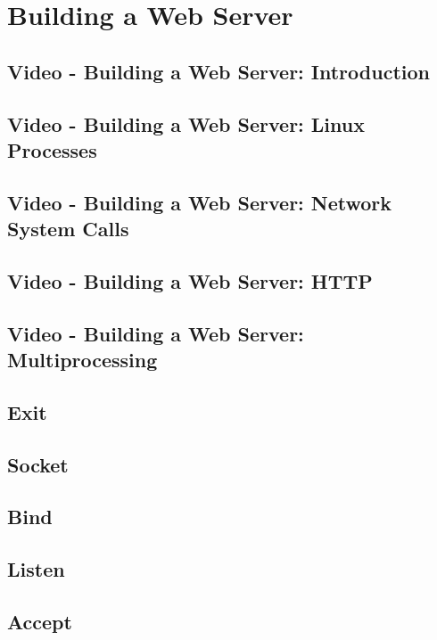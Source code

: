 \section{Building a Web Server}\label{sec:building_a_web_server}
\subsection{Video - Building a Web Server: Introduction }\label{subsec:video_building_a_web_server_introduction}
\subsection{Video - Building a Web Server: Linux Processes }\label{subsec:video_building_a_web_server_linux_processes}
\subsection{Video - Building a Web Server: Network System Calls }\label{subsec:video_building_a_web_server_network_system_calls}
\subsection{Video - Building a Web Server: HTTP }\label{subsec:video_building_a_web_server_http}
\subsection{Video - Building a Web Server: Multiprocessing }\label{subsec:video_building_a_web_server_multiprocessing}
\subsection{Exit}\label{subsec:exit}
\subsection{Socket }\label{subsec:socket}
\subsection{Bind }\label{subsec:bind}
\subsection{Listen}\label{subsec:listen}
\subsection{Accept}\label{subsec:accept}
